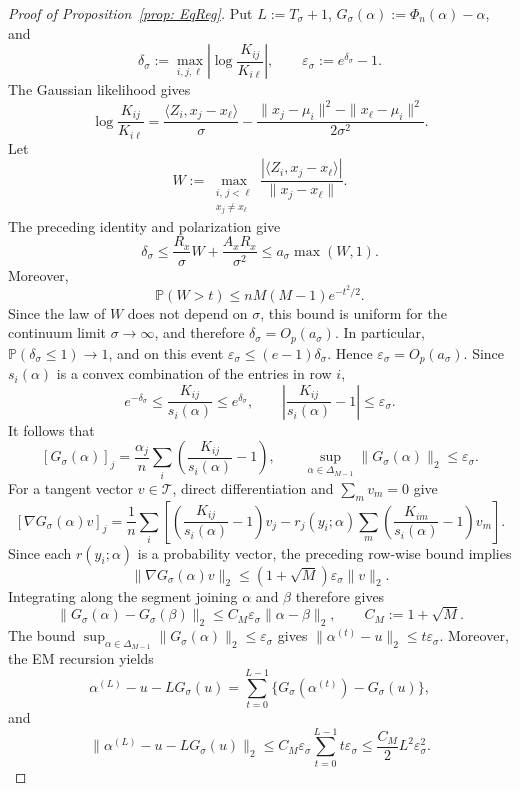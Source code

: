 \documentclass[12pt]{iopart}
\providecommand{\x}{\mathbf{x}}
\theoremstyle{remark}
\begin{document}
\begin{proof}[Proof of Proposition~\ref{prop: EqReg}]
Put $L:=T_\sigma+1$, $G_\sigma(\alpha):=\Phi_n(\alpha)-\alpha$, and
\[
\delta_\sigma:=\max_{i,j,\ell}
\left|\log\frac{K_{ij}}{K_{i\ell}}\right|,
\qquad
\varepsilon_\sigma:=e^{\delta_\sigma}-1.
\]
The Gaussian likelihood gives
\[
\log\frac{K_{ij}}{K_{i\ell}}
=\frac{\langle Z_i,x_j-x_\ell\rangle}{\sigma}
-\frac{\|x_j-\mu_i\|^2-\|x_\ell-\mu_i\|^2}{2\sigma^2}.
\]
Let
\[
W:=\max_{\substack{i,\,j<\ell\\x_j\neq x_\ell}}
\frac{|\langle Z_i,x_j-x_\ell\rangle|}{\|x_j-x_\ell\|}.
\]
The preceding identity and polarization give
\[
\delta_\sigma
\leq \frac{R_x}{\sigma}W+\frac{A_xR_x}{\sigma^2}
\leq a_\sigma\max(W,1).
\]
Moreover,
\[
\mathbb P(W>t)\leq nM(M-1)e^{-t^2/2}.
\]
Since the law of $W$ does not depend on $\sigma$, this bound is uniform for
the continuum limit $\sigma\to\infty$, and therefore
$\delta_\sigma=O_p(a_\sigma)$. In particular,
$\mathbb P(\delta_\sigma\leq1)\to1$, and on this event
$\varepsilon_\sigma\leq(e-1)\delta_\sigma$. Hence
$\varepsilon_\sigma=O_p(a_\sigma)$.
Since $s_i(\alpha)$ is a convex combination of the entries in row $i$,
\[
e^{-\delta_\sigma}\leq\frac{K_{ij}}{s_i(\alpha)}
\leq e^{\delta_\sigma},
\qquad
\left|\frac{K_{ij}}{s_i(\alpha)}-1\right|
\leq\varepsilon_\sigma.
\]
It follows that
\[
[G_\sigma(\alpha)]_j
=\frac{\alpha_j}{n}\sum_i
\left(\frac{K_{ij}}{s_i(\alpha)}-1\right),
\qquad
\sup_{\alpha\in\Delta_{M-1}}\|G_\sigma(\alpha)\|_2
\leq\varepsilon_\sigma.
\]
For a tangent vector $v\in\mathcal T$, direct differentiation and
$\sum_m v_m=0$ give
\[
[\nabla G_\sigma(\alpha)v]_j
=\frac1n\sum_i\left[
\left(\frac{K_{ij}}{s_i(\alpha)}-1\right)v_j
-r_j(y_i;\alpha)\sum_m
\left(\frac{K_{im}}{s_i(\alpha)}-1\right)v_m
\right].
\]
Since each $r(y_i;\alpha)$ is a probability vector, the preceding row-wise
bound implies
\[
\|\nabla G_\sigma(\alpha)v\|_2
\leq(1+\sqrt M)\varepsilon_\sigma\|v\|_2.
\]
Integrating along the segment joining $\alpha$ and $\beta$ therefore gives
\[
\|G_\sigma(\alpha)-G_\sigma(\beta)\|_2
\leq C_M\varepsilon_\sigma\|\alpha-\beta\|_2,
\qquad C_M:=1+\sqrt M.
\]
The bound
$\sup_{\alpha\in\Delta_{M-1}}\|G_\sigma(\alpha)\|_2
\leq\varepsilon_\sigma$ gives
$\|\alpha^{(t)}-u\|_2\leq t\varepsilon_\sigma$.
Moreover, the EM recursion yields
\[
\alpha^{(L)}-u-LG_\sigma(u)
=\sum_{t=0}^{L-1}
\bigl\{G_\sigma(\alpha^{(t)})-G_\sigma(u)\bigr\},
\]
and
\[
\|\alpha^{(L)}-u-LG_\sigma(u)\|_2
\leq C_M\varepsilon_\sigma
\sum_{t=0}^{L-1}t\varepsilon_\sigma
\leq \frac{C_M}{2}L^2\varepsilon_\sigma^2.
\]


\end{proof}
\end{document}
